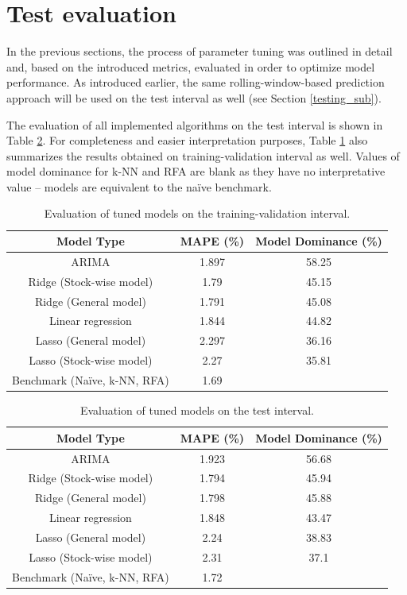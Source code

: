 \section{Test evaluation}
In the previous sections, the process of parameter tuning was outlined in detail and, based on the introduced metrics, evaluated in order to optimize
model performance. As introduced earlier, the same rolling-window-based prediction approach will be used on the test interval as well (see Section \ref{testing_sub}).

The evaluation of all implemented algorithms on the test interval is shown in Table \ref{tab:test}. For completeness and easier interpretation purposes,
Table \ref{tab:trainval} also summarizes the results obtained on training-validation interval as well. Values of model dominance for k-NN and RFA are blank as they
have no interpretative value – models are equivalent to the naïve benchmark. 
\begin{table}[H]
\centering
\begin{tabular}{|c|c|c|}
\hline
\textbf{Model Type} & \textbf{MAPE (\%)} & \textbf{Model Dominance (\%)} \\
\hline
ARIMA & 1.897 & 58.25 \\
\hline
Ridge (Stock-wise model) & 1.79 & 45.15 \\
\hline
Ridge (General model) & 1.791 & 45.08 \\
\hline
Linear regression & 1.844 & 44.82 \\
\hline
Lasso (General model) & 2.297 & 36.16 \\
\hline
Lasso (Stock-wise model) & 2.27 & 35.81 \\
\hline
Benchmark (Naïve, k-NN, RFA)  & 1.69 & \\
\hline
\end{tabular}
\caption{ Evaluation of tuned models on the training-validation interval.}
\label{tab:trainval}
\end{table}

\begin{table}[H]
\centering
\begin{tabular}{|c|c|c|}
\hline
\textbf{Model Type} & \textbf{MAPE (\%)} & \textbf{Model Dominance (\%)} \\
\hline
ARIMA & 1.923 & 56.68 \\
\hline
Ridge (Stock-wise model) & 1.794 & 45.94 \\
\hline
Ridge (General model) & 1.798 & 45.88 \\
\hline
Linear regression & 1.848 & 43.47 \\
\hline
Lasso (General model) & 2.24 & 38.83 \\
\hline
Lasso (Stock-wise model) & 2.31 & 37.1 \\
\hline
Benchmark (Naïve, k-NN, RFA) & 1.72 & \\
\hline
\end{tabular}
\caption{ Evaluation of tuned models on the test interval.}
\label{tab:test}
\end{table}

